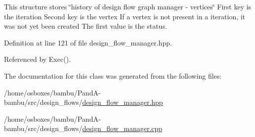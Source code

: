 This structure stores \char`\"{}history of design flow graph manager -\/ vertices\char`\"{} First key is the iteration Second key is the vertex If a vertex is not present in a iteration, it was not yet been created The first value is the status. 



Definition at line 121 of file design\+\_\+flow\+\_\+manager.\+hpp.



Referenced by Exec().



The documentation for this class was generated from the following files\+:\begin{DoxyCompactItemize}
\item 
/home/osboxes/bambu/\+Pand\+A-\/bambu/src/design\+\_\+flows/\hyperlink{design__flow__manager_8hpp}{design\+\_\+flow\+\_\+manager.\+hpp}\item 
/home/osboxes/bambu/\+Pand\+A-\/bambu/src/design\+\_\+flows/\hyperlink{design__flow__manager_8cpp}{design\+\_\+flow\+\_\+manager.\+cpp}\end{DoxyCompactItemize}
